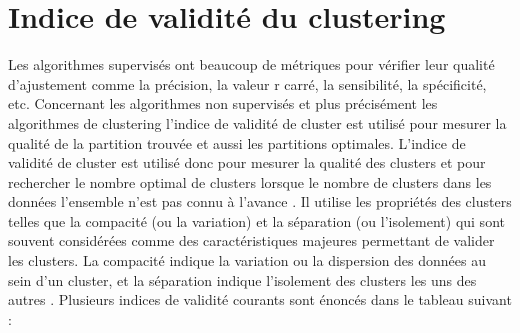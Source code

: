 \section{Indice de validité du clustering}
Les algorithmes supervisés ont beaucoup de métriques pour vérifier leur qualité d'ajustement comme la précision, la valeur r carré, la sensibilité, la spécificité, etc. Concernant les algorithmes non supervisés et plus précisément les algorithmes de clustering l’indice de validité de cluster est utilisé pour mesurer la qualité de la partition trouvée et aussi les partitions optimales. L’indice de validité de cluster est utilisé donc pour mesurer la qualité des clusters et pour rechercher le nombre optimal de clusters lorsque le nombre de clusters dans les données l'ensemble n'est pas connu à l'avance \cite{rezaee1998new}. Il utilise les propriétés des clusters telles que la compacité (ou la variation) et la séparation (ou l'isolement) qui sont souvent considérées comme des caractéristiques majeures permettant de valider les clusters. La compacité indique la variation ou la dispersion des données au sein d'un cluster, et la séparation indique l'isolement des clusters les uns des autres \cite{ZHANG20081205} . Plusieurs indices de validité courants sont énoncés dans le tableau suivant :
